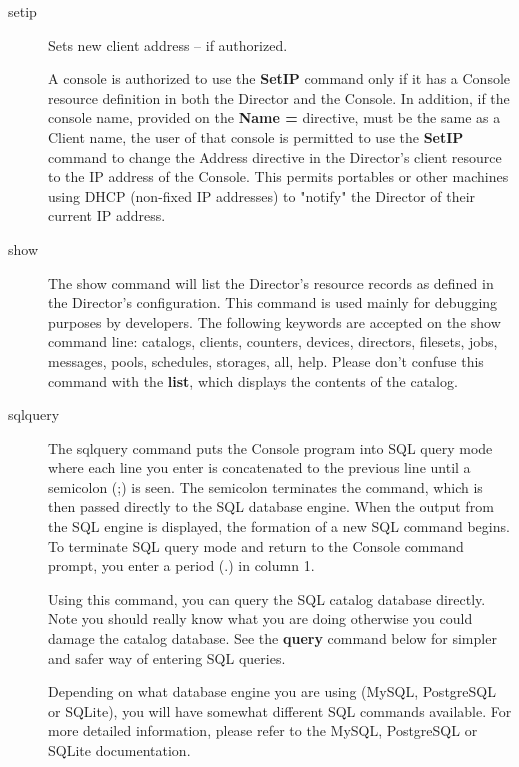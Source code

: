 \begin{description}
\item [setip]
   \label{bcommandSetIP}
   Sets new client address -- if authorized.

   A console is authorized to use the {\bf SetIP} command only if it has a
   Console resource definition in both the Director and the Console.  In
   addition, if the console name, provided on the {\bf Name =} directive,
   must be the same as a Client name, the user of that console is permitted
   to use the {\bf SetIP} command to change the Address directive in the
   Director's client resource to the IP address of the Console.  This
   permits portables or other machines using DHCP (non-fixed IP addresses)
   to "notify" the Director of their current IP address.

\item [show]
   The show command will list the Director's resource records as defined in
   the Director's configuration.
   This command is used mainly for debugging purposes by developers.
   The following keywords are accepted on the
   show command line: catalogs, clients, counters, devices, directors,
   filesets, jobs, messages, pools, schedules, storages, all, help.
   Please don't confuse this command
   with the {\bf list}, which displays the contents of the catalog.

\item [sqlquery]
   The sqlquery command puts the Console program into SQL query mode where
   each line you enter is concatenated to the previous line until a
   semicolon (;) is seen.  The semicolon terminates the command, which is
   then passed directly to the SQL database engine.  When the output from
   the SQL engine is displayed, the formation of a new SQL command begins.
   To terminate SQL query mode and return to the Console command prompt,
   you enter a period (.) in column 1.

   Using this command, you can query the SQL catalog database directly.
   Note you should really know what you are doing otherwise you could
   damage the catalog database.  See the {\bf query} command below for
   simpler and safer way of entering SQL queries.

   Depending on what database engine you are using (MySQL, PostgreSQL or
   SQLite), you will have somewhat different SQL commands available.  For
   more detailed information, please refer to the MySQL, PostgreSQL or
   SQLite documentation.


\end{description}
